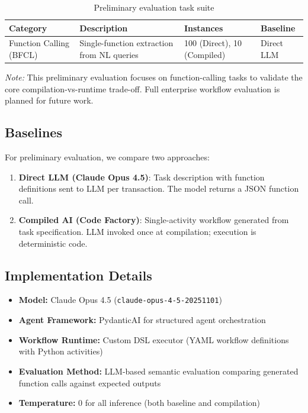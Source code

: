 \documentclass[11pt]{article}
\begin{document}
\begin{table}[ht]
\centering
\caption{Preliminary evaluation task suite}
\label{tab:tasks}
\begin{tabular}{p{3.5cm}p{4cm}p{2cm}p{2.5cm}}
\toprule
Category & Description & Instances & Baseline \\
\midrule
Function Calling (BFCL) & Single-function extraction from NL queries & 100 (Direct), 10 (Compiled) & Direct LLM \\
\bottomrule
\end{tabular}
\end{table}

\noindent\textit{Note:} This preliminary evaluation focuses on function-calling tasks to validate the core compilation-vs-runtime trade-off. Full enterprise workflow evaluation is planned for future work.

\subsection{Baselines}

For preliminary evaluation, we compare two approaches:

\begin{enumerate}
    \item \textbf{Direct LLM (Claude Opus 4.5)}: Task description with function definitions sent to LLM per transaction. The model returns a JSON function call.
    \item \textbf{Compiled AI (Code Factory)}: Single-activity workflow generated from task specification. LLM invoked once at compilation; execution is deterministic code.
\end{enumerate}

\subsection{Implementation Details}

\begin{itemize}
    \item \textbf{Model:} Claude Opus 4.5 (\texttt{claude-opus-4-5-20251101})
    \item \textbf{Agent Framework:} PydanticAI for structured agent orchestration
    \item \textbf{Workflow Runtime:} Custom DSL executor (YAML workflow definitions with Python activities)
    \item \textbf{Evaluation Method:} LLM-based semantic evaluation comparing generated function calls against expected outputs
    \item \textbf{Temperature:} 0 for all inference (both baseline and compilation)
\end{itemize}
\end{document}
